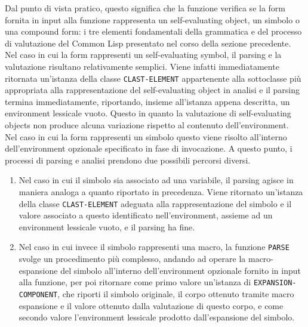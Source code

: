 Dal punto di vista pratico, questo significa che la funzione verifica se la
form fornita in input alla funzione rappresenta un self-evaluating object, un
simbolo o una compound form: i tre elementi fondamentali della grammatica e
del processo di valutazione del Common Lisp presentato nel corso della sezione
precedente.\\

Nel caso in cui la form rappresenti un self-evaluating symbol, il parsing e la
valutazione risultano relativamente semplici. Viene infatti immediatamente
ritornata un’istanza della classe \texttt{CLAST-ELEMENT} appartenente alla
sottoclasse più appropriata alla rappresentazione del self-evaluating object
in analisi e il parsing termina immediatamente, riportando, insieme
all’istanza appena descritta, un environment lessicale vuoto. Questo in quanto
la valutazione di self-evaluating objects non produce alcuna variazione
rispetto al contenuto dell'environment.\\

Nel caso in cui la form rappresenti un simbolo questo viene risolto all’interno
dell’environment opzionale specificato in fase di invocazione. A questo punto, i
processi di parsing e analisi prendono due possibili percorsi diversi.

\begin{enumerate}

\item Nel caso in cui il simbolo sia associato ad una variabile, il parsing
agisce in maniera analoga a quanto riportato in precedenza. Viene ritornato
un’istanza della classe \texttt{CLAST-ELEMENT} adeguata alla rappresentazione
del simbolo e il valore associato a questo identificato nell’environment,
assieme ad un environment lessicale vuoto, e il parsing ha fine.

\item Nel caso in cui invece il simbolo rappresenti una macro, la funzione
\texttt{PARSE} svolge un procedimento più complesso, andando ad operare la
macro-espansione del simbolo all’interno dell’environment opzionale fornito in
input alla funzione, per poi ritornare come primo valore un’istanza di \texttt
{EXPANSION-COMPONENT}, che riporti il simbolo originale, il corpo ottenuto
tramite macro espansione e il valore ottenuto dalla valutazione di questo
corpo, e come secondo valore l’environment lessicale prodotto dall’espansione
del simbolo.

\end{enumerate}


